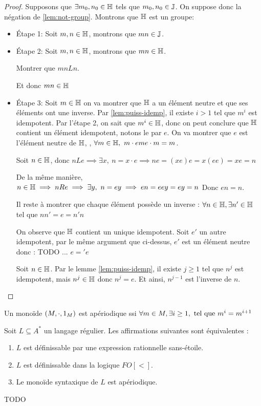 \begin{proof}

	Supposons que $\exists m_0, n_0 \in \mathbb{H}$ tels que $m_0,n_0 \in \mathbb{J}$. On suppose donc la négation de \ref{lem:not-group}.
	Montrons que $\mathbb{H}$ est un groupe:
	\begin{itemize}
		\item Étape 1: Soit $m,n \in \mathbb{H}$, montrons que $mn \in \mathbb{J}$.

		\item Étape 2: Soit $m,n \in \mathbb{H}$, montrons que $mn \in \mathbb{H}$.

		      \begin{exercice}
			      Montrer que $mn L n$.
		      \end{exercice}

		      Et donc $mn \in \mathbb{H}$
		\item Étape 3: Soit $m \in \mathbb{H}$ on va montrer que $\mathbb{H}$ a un élément neutre et que ses éléments ont une inverse.
		      Par \ref{lem:puiss-idemp}, il existe $i > 1$ tel que $m^i$ est idempotent.
		      Par l'étape 2, on sait que $m^i \in \mathbb{H}$, donc on peut conclure que $\mathbb{H}$ contient un élément idempotent, notons le par
		      $e$. On va montrer que $e$ est l'élément neutre de $\mathbb{H}$, \cad, $\forall m \in \mathbb{H}, \ m\cdot e m  e \cdot m = m$.

		      Soit $n \in \mathbb{H}$, donc $n L e \implies \exists x, \ n = x\cdot e
			      \implies n e = (x e) e =  x (ee) =  x e = n$

		      De la même manière, $n \in \mathbb{H} \implies n R e \implies \exists y, \ n = ey \implies en = eey = ey = n$
		      Donc $e n = n$.

		      Il reste à montrer que chaque élément possède un inverse : $\forall n \in \mathbb{H}, \exists n' \in \mathbb{H}$ tel que $n n' = e = n'n$

		      On observe que $\mathbb{H}$ contient un unique idempotent. Soit $e'$ un autre idempotent, par le même argument
		      que ci-dessus, $e'$ est un élément neutre donc : TODO ... $e = 'e$

		      Soit $n \in \mathbb{H}$. Par le lemme \ref{lem:puiss-idemp}, il existe $j \geq 1$ tel que $n^j$ est idempotent, mais $n^j \in \mathbb{H}$ donc $n^j = e$. Et ainsi,
		      $n^{j-1}$ est l'inverse de $n$.
	\end{itemize}
\end{proof}

\begin{definition}
	Un monoïde $(M, \cdot, 1_M)$ est apériodique ssi $\forall m \in M, \exists i \geq 1, \text { tel que } m^i = m^{i+1}$
\end{definition}


\begin{theorem}[Schützenberger]
	Soit $L\subseteq A^*$ un langage régulier. Les affirmations suivantes sont équivalentes :
	\begin{enumerate}
		\item $L$ est définissable par une expression rationnelle sans-étoile.
		\item $L$ est définissable dans la logique $FO[<]$.
		\item Le monoïde syntaxique de $L$ est apériodique.
	\end{enumerate}
\end{theorem}

TODO
